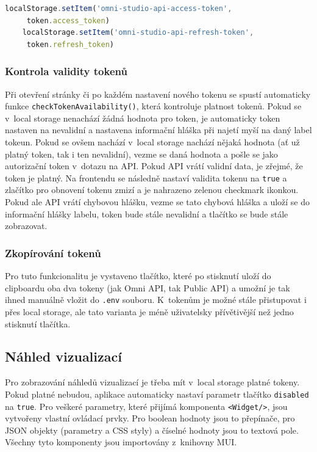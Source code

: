 \documentclass[czech, bc, kiv, he, iso690numb]{fasthesis}
\begin{document}
\begin{lstlisting}[language=Javascript, caption={Ukládání Omni API tokenů do local storage}, label=savingOmniToken]
	localStorage.setItem('omni-studio-api-access-token',
	 token.access_token)
	localStorage.setItem('omni-studio-api-refresh-token',
	 token.refresh_token)
\end{lstlisting}
	
\subsubsection{Kontrola validity tokenů}

Při otevření stránky či po každém nastavení nového tokenu se spustí automaticky funkce \texttt{checkTokenAvailability()}, která kontroluje platnost tokenů. Pokud se v~local storage nenachází
žádná hodnota pro token, je automaticky token nastaven na nevalidní a nastavena informační hláška při najetí myší na daný label tokeun. Pokud se ovšem nachází v~local storage nachází
nějaká hodnota (ať už platný token, tak i ten nevalidní), vezme se daná hodnota a pošle se jako autorizační token v~dotazu na API. Pokud API vrátí validní data, je zřejmé, že token je platný.
Na frontendu se následně nastaví validita tokenu na \texttt{true} a zlačítko pro obnovení tokenu zmizí a je nahrazeno zelenou checkmark ikonkou. Pokud ale API vrátí chybovou hlášku, 
vezme se tato chybová hláška a uloží se do informační hlášky labelu, token bude stále nevalidní a tlačítko se bude stále zobrazovat. 

\subsubsection{Zkopírování tokenů}

Pro tuto funkcionalitu je vystaveno tlačítko, které po stisknutí uloží do clipboardu oba dva tokeny (jak Omni API, tak Public API) a umožní je tak ihned
manuálně vložit do \texttt{.env} souboru. K~tokenům je možné stále přistupovat i přes local storage, ale tato varianta je méně uživatelsky přívětivější než jedno stisknutí tlačítka.



\subsection{Náhled vizualizací}
Pro zobrazování náhledů vizualizací je třeba mít v~local storage platné tokeny. Pokud platné nebudou, aplikace automaticky nastaví parametr tlačítko
\texttt{disabled} na \texttt{true}. Pro veškeré parametry, které přijímá komponenta \texttt{<Widget/>}, jsou vytvořeny vlastní ovládací prvky.
Pro boolean hodnoty jsou to přepínače, pro JSON objekty (parametry a CSS styly) a číselné hodnoty jsou to textová pole. Všechny tyto komponenty
jsou importovány z~knihovny MUI.
\end{document}
